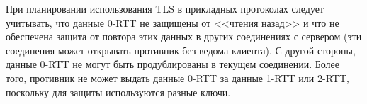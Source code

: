 При планировании использования TLS в прикладных протоколах следует учитывать,
что данные 0-RTT не защищены от <<чтения назад>> и что не обеспечена защита от
повтора этих данных в других соединениях с сервером (эти соединения может
открывать противник без ведома клиента).
%
С другой стороны, данные 0-RTT не могут быть продублированы в текущем
соединении. Более того, противник не может выдать данные 0-RTT за данные 1-RTT 
или 2-RTT, поскольку для защиты используются разные ключи.


